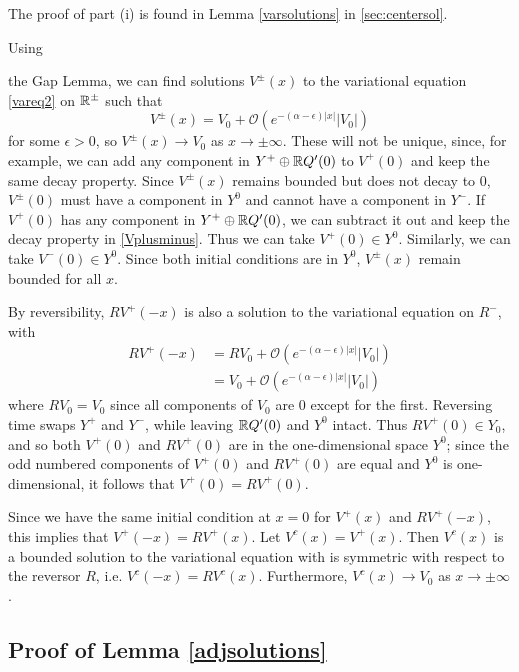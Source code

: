 \documentclass[thesis.tex]{subfiles}
\begin{document}
The proof of part (i) is found in Lemma \ref{varsolutions} in \cref{sec:centersol}.

Using 

the Gap Lemma, we can find solutions $V^\pm(x)$ to the variational equation \eqref{vareq2} on $\mathbb{R}^\pm$ such that
\begin{equation}\label{Vplusminus}
V^\pm(x) = V_0 + \mathcal{O}(e^{-(\alpha - \epsilon)|x|}|V_0|)
\end{equation}
for some $\epsilon > 0$, so $V^\pm(x) \rightarrow V_0$ as $x \rightarrow \pm \infty$. These will not be unique, since, for example, we can add any component in $Y^+ \oplus \mathbb{R} Q'(0)$ to $V^+(0)$ and keep the same decay property. Since $V^\pm(x)$ remains bounded but does not decay to 0, $V^\pm(0)$ must have a component in $Y^0$ and cannot have a component in $Y^-$. If $V^+(0)$ has any component in $Y^+ \oplus \mathbb{R} Q'(0)$, we can subtract it out and keep the decay property in \eqref{Vplusminus}. Thus we can take $V^+(0) \in Y^0$. Similarly, we can take $V^-(0) \in Y^0$. Since both initial conditions are in $Y^0$, $V^\pm(x)$ remain bounded for all $x$.

By reversibility, $RV^+(-x)$ is also a solution to the variational equation on $R^-$, with 
\begin{align*}
R V^+(-x) &= R V_0 + \mathcal{O}(e^{-(\alpha - \epsilon)|x|}|V_0|) \\
&= V_0 + \mathcal{O}(e^{-(\alpha - \epsilon)|x|}|V_0|)
\end{align*}
where $R V_0 = V_0$ since all components of $V_0$ are 0 except for the first. Reversing time swaps $Y^+$ and $Y^-$, while leaving $\mathbb{R} Q'(0)$ and $Y^0$ intact. Thus $RV^+(0) \in Y_0$, and so both $V^+(0)$ and $RV^+(0)$ are in the one-dimensional space $Y^0$; since the odd numbered components of $V^+(0)$ and $RV^+(0)$ are equal and $Y^0$ is one-dimensional, it follows that $V^+(0) = RV^+(0)$.

Since we have the same initial condition at $x = 0$ for $V^+(x)$ and $RV^+(-x)$, this implies that $V^+(-x) = RV^+(x)$. Let $V^c(x) = V^+(x)$. Then $V^c(x)$ is a bounded solution to the variational equation with is symmetric with respect to the reversor $R$, i.e. $V^c(-x) = RV^c(x)$. Furthermore, $V^c(x) \rightarrow V_0$ as $x \rightarrow \pm \infty$.

\subsection{Proof of Lemma \ref{adjsolutions}}
\end{document}
